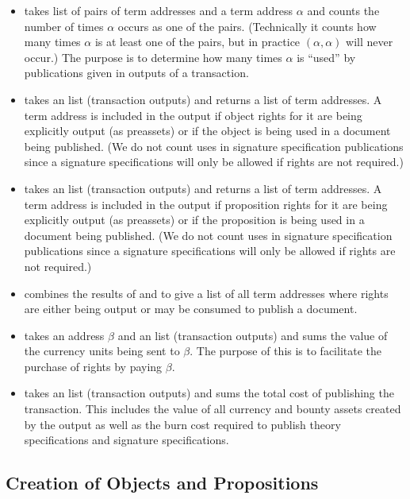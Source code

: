 \begin{itemize}
\item {} takes list of pairs of term addresses and a term address $\alpha$
and counts the number of times $\alpha$ occurs as one of the pairs. (Technically it counts
how many times $\alpha$ is at least one of the pairs, but in practice $(\alpha,\alpha)$ will
never occur.)
The purpose is to determine how many times $\alpha$ is ``used'' by publications
given in outputs of a transaction.
\item {} takes an {} list (transaction outputs)
and returns a list of term addresses.
A term address is included in the output if
object rights for it are being explicitly output
(as {} preassets)
or if the object is being used in a document being published.
(We do not count uses in signature specification publications since
a signature specifications will only be allowed if rights are not required.)
\item {} takes an {} list (transaction outputs)
and returns a list of term addresses.
A term address is included in the output if
proposition rights for it are being explicitly output
(as {} preassets)
or if the proposition is being used in a document being published.
(We do not count uses in signature specification publications since
a signature specifications will only be allowed if rights are not required.)
\item {} combines the results of {}
and {} to give a list of all term addresses
where rights are either being output or may be consumed to publish a document.
\item {} takes an address $\beta$
and an {} list (transaction outputs)
and sums the value of the currency units being sent to $\beta$.
The purpose of this is to facilitate the purchase of rights by paying $\beta$.
\item {} takes an {} list (transaction outputs)
and sums the total cost of publishing the transaction.
This includes the value of all currency and bounty assets created by the output
as well as the burn cost required to publish theory specifications
and signature specifications.
\end{itemize}

\subsection{Creation of Objects and Propositions}\label{sec:outputcreates}

